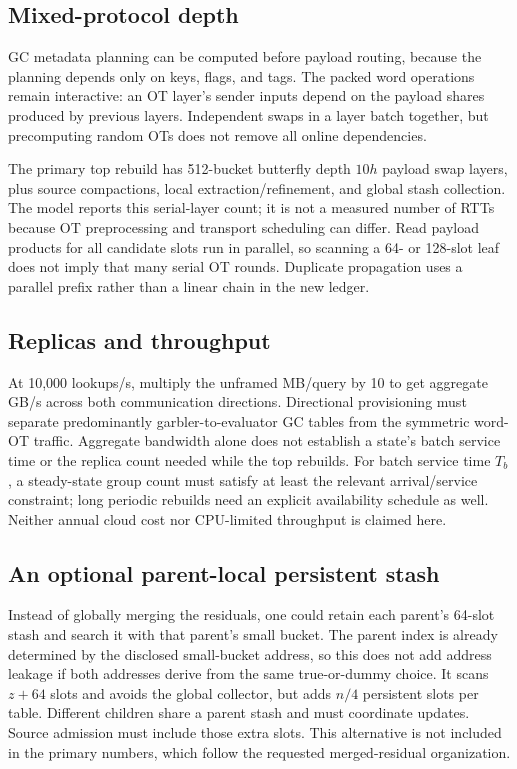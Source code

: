 \documentclass[11pt]{article}
\begin{document}
\subsection{Mixed-protocol depth}
GC metadata planning can be computed before payload routing, because the
planning depends only on keys, flags, and tags. The packed word operations
remain interactive: an OT layer's sender inputs depend on the payload
shares produced by previous layers. Independent swaps in a layer batch
together, but precomputing random OTs does not remove all online dependencies.

The primary top rebuild has 512-bucket butterfly depth $10h$ payload
swap layers, plus source compactions, local extraction/refinement, and
global stash collection. The model reports this serial-layer count; it is
not a measured number of RTTs because OT preprocessing and transport
scheduling can differ. Read payload products for all candidate slots run
in parallel, so scanning a 64- or 128-slot leaf does not imply that many
serial OT rounds. Duplicate propagation uses a parallel prefix rather
than a linear chain in the new ledger.

\subsection{Replicas and throughput}
At 10,000 lookups/s, multiply the unframed MB/query by 10 to get aggregate
GB/s across both communication directions. Directional provisioning must
separate predominantly garbler-to-evaluator GC tables from the symmetric
word-OT traffic. Aggregate bandwidth alone does not establish a state's
batch service time or the replica count needed while the top rebuilds.
For batch service time $T_b$, a steady-state group count must satisfy at
least the relevant arrival/service constraint; long periodic rebuilds need
an explicit availability schedule as well. Neither annual cloud cost nor
CPU-limited throughput is claimed here.

\subsection{An optional parent-local persistent stash}
Instead of globally merging the residuals, one could retain each parent's
64-slot stash and search it with that parent's small bucket. The parent
index is already determined by the disclosed small-bucket address, so this
does not add address leakage if both addresses derive from the same
true-or-dummy choice. It scans $z+64$ slots and avoids the global collector,
but adds $n/4$ persistent slots per table. Different children share a parent
stash and must coordinate updates. Source admission must include those
extra slots. This alternative is not included in the primary numbers,
which follow the requested merged-residual organization.
\end{document}
